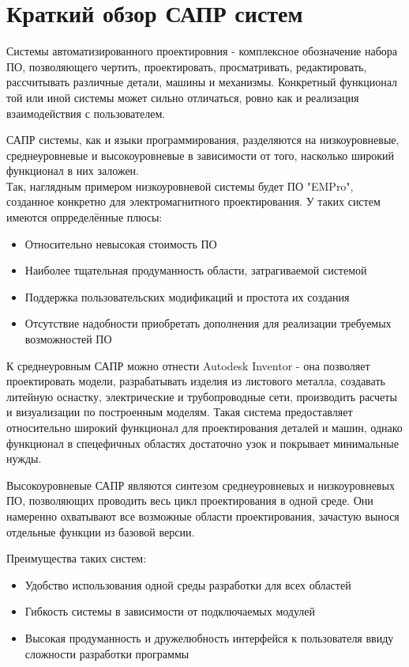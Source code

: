 \chapter{Краткий обзор САПР систем}
Системы автоматизированного проектировния - комплексное обозначение набора ПО, позволяющего 
чертить, проектировать, просматривать, редактировать, рассчитывать различные детали, машины и механизмы. 
Конкретный функционал той или иной системы может сильно отличаться, ровно как и реализация взаимодействия с пользователем.
\par
САПР системы, как и языки программирования, разделяются на низкоуровневые, среднеуровневые и высокоуровневые в зависимости от того, насколько широкий функционал в них заложен. \\
Так, наглядным примером низкоуровневой системы будет ПО "EMPro", созданное конкретно для электромагнитного проектирования. У таких систем имеются опрределённые плюсы:
\begin{itemize}
	\item Относительно невысокая стоимость ПО
	\item Наиболее тщательная продуманность области, затрагиваемой системой
	\item Поддержка пользовательских модификаций и простота их создания
	\item Отсутствие надобности приобретать дополнения для реализации требуемых возможностей ПО
\end{itemize}
\par
К среднеуровным САПР можно отнести Autodesk Inventor - она позволяет проектировать модели, разрабатывать изделия из листового металла, создавать литейную оснастку, электрические и трубопроводные сети, производить расчеты и визуализации по построенным моделям. Такая система предоставляет относительно широкий функционал для проектирования деталей и машин, однако функционал в спецефичных областях достаточно узок и покрывает минимальные нужды. \par
Высокоуровневые САПР являются синтезом среднеуровневых и низкоуровневых ПО, позволяющих проводить весь цикл проектирования в одной среде. Они намеренно охватывают все возможные области проектирования, зачастую вынося отдельные функции из базовой версии.\par
Преимущества таких систем:
\begin{itemize}
	\item Удобство использования одной среды разработки для всех областей
	\item Гибкость системы в зависимости от подключаемых модулей
	\item Высокая продуманность и дружелюбность интерфейся к пользователя ввиду сложности разработки программы
\end{itemize}
